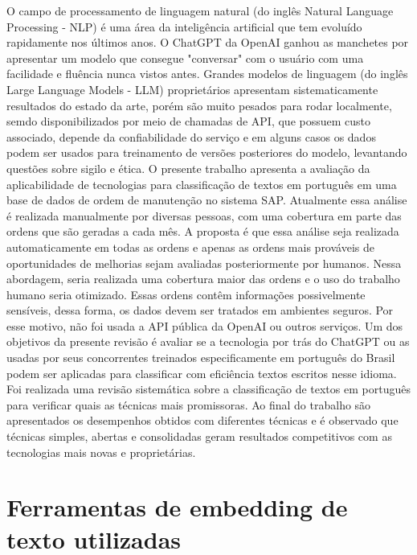 \documentclass[conference]{IEEEtran}
\begin{document}
  O campo de processamento de linguagem natural (do inglês Natural Language Processing - NLP) é uma área da inteligência artificial que tem evoluído rapidamente nos últimos anos. O ChatGPT da OpenAI \cite{NIPS2017_3f5ee243} \cite{Radford2018ImprovingLU} \cite{radford_language_2019} \cite{brown2020language} ganhou as manchetes por apresentar um modelo que consegue "conversar" com o usuário com uma facilidade e fluência nunca vistos antes. Grandes modelos de linguagem (do inglês Large Language Models - LLM) proprietários apresentam sistematicamente resultados do estado da arte, porém são muito pesados para rodar localmente, semdo disponibilizados por meio de chamadas de API, que possuem custo associado, depende da confiabilidade do serviço e em alguns casos os dados podem ser usados para treinamento de versões posteriores do modelo, levantando questões sobre sigilo e ética. O presente trabalho apresenta a avaliação da aplicabilidade de tecnologias para classificação de textos em português em uma base de dados de ordem de manutenção no sistema SAP. Atualmente essa análise é realizada manualmente por diversas pessoas, com uma cobertura em parte das ordens que são geradas a cada mês. A proposta é que essa análise seja realizada automaticamente em todas as ordens e apenas as ordens mais prováveis de oportunidades de melhorias sejam avaliadas posteriormente por humanos. Nessa abordagem, seria realizada uma cobertura maior das ordens e o uso do trabalho humano seria otimizado. Essas ordens contêm informações possivelmente sensíveis, dessa forma, os dados devem ser tratados em ambientes seguros. Por esse motivo, não foi usada a API pública da OpenAI ou outros serviços. Um dos objetivos da presente revisão é avaliar se a tecnologia por trás do ChatGPT ou as usadas por seus concorrentes treinados especificamente em português do Brasil \cite{souza2020bertimbau} \cite{Gomes2021} podem ser aplicadas para classificar com eficiência textos escritos nesse idioma. Foi realizada uma revisão sistemática sobre a classificação de textos em português para verificar quais as técnicas mais promissoras. Ao final do trabalho são apresentados os desempenhos obtidos com diferentes técnicas e é observado que técnicas simples, abertas e consolidadas geram resultados competitivos com as tecnologias mais novas e proprietárias.

\section{Ferramentas de embedding de texto utilizadas}
\end{document}
